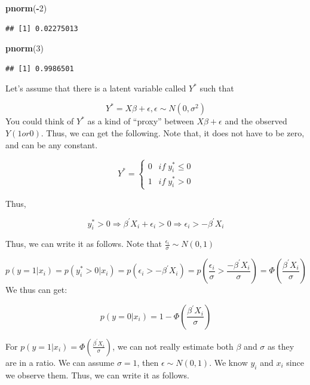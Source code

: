 \documentclass[]{book}
\newenvironment{Shaded}{\begin{snugshade}}{\end{snugshade}}
\newcommand{\DecValTok}[1]{\textcolor[rgb]{0.00,0.00,0.81}{#1}}
\newcommand{\KeywordTok}[1]{\textcolor[rgb]{0.13,0.29,0.53}{\textbf{#1}}}
\newcommand{\NormalTok}[1]{#1}
\newcommand{\OperatorTok}[1]{\textcolor[rgb]{0.81,0.36,0.00}{\textbf{#1}}}
\begin{document}
\begin{Shaded}
\begin{Highlighting}[]
\KeywordTok{pnorm}\NormalTok{(}\OperatorTok{-}\DecValTok{2}\NormalTok{)}
\end{Highlighting}
\end{Shaded}

\begin{verbatim}
## [1] 0.02275013
\end{verbatim}

\begin{Shaded}
\begin{Highlighting}[]
\KeywordTok{pnorm}\NormalTok{(}\DecValTok{3}\NormalTok{)}
\end{Highlighting}
\end{Shaded}

\begin{verbatim}
## [1] 0.9986501
\end{verbatim}

Let's assume that there is a latent variable called \(Y^*\) such that

\[Y^*=X\beta+\epsilon, \epsilon \sim N(0,\sigma^2)\]
You could think of \(Y^*\) as a kind of ``proxy'' between \(X\beta+\epsilon\) and the observed \(Y (1 or 0)\). Thus, we can get the following. Note that, it does not have to be zero, and can be any constant.

\[
Y^*=\begin{cases} 0 \;\;\: if \;  y_i^* \leq 0 \\ 1 \;\;\: if \;  y_i^* > 0 \end{cases}
\]

Thus,

\[y_i^* > 0 \Rightarrow \beta^{'}X_i + \epsilon_i >0 \Rightarrow \epsilon_i > -\beta^{'}X_i\]

Thus, we can write it as follows. Note that \(\frac{ \epsilon_i}{\sigma} \sim N(0,1)\)

\[p(y=1|x_i)= p(y_i^* >0|x_i)=p(\epsilon_i > -\beta^{'}X_i)= p(\frac{ \epsilon_i}{\sigma}>\frac{-\beta^{'}X_i}{\sigma})=\Phi(\frac{\beta^{'}X_i}{\sigma}) \]
We thus can get:

\[p(y=0|x_i)=1-\Phi(\frac{\beta^{'}X_i}{\sigma})\]

For \(p(y=1|x_i)=\Phi(\frac{\beta^{'}X_i}{\sigma})\), we can not really estimate both \(\beta\) and \(\sigma\) as they are in a ratio. We can assume \(\sigma =1\), then \(\epsilon \sim N(0,1)\).
We know \(y_i\) and \(x_i\) since we observe them. Thus, we can write it as follows.
\end{document}
